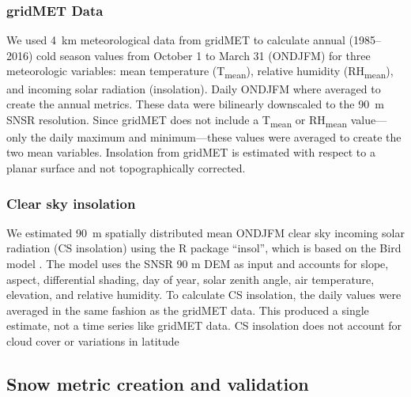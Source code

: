 \hypertarget{ch2-do-2}{\subsubsection{gridMET Data}\label{ch2-do-2}}

We used 4~km meteorological data from gridMET \citep{abatzoglouDevelopmentGriddedSurface2013} to calculate annual (1985--2016) cold season values from October 1 to March 31 (ONDJFM) for three meteorologic variables: mean temperature (T\textsubscript{mean}), relative humidity (RH\textsubscript{mean}), and incoming solar radiation (insolation). Daily ONDJFM where averaged to create the annual metrics. These data were bilinearly downscaled to the 90~m SNSR resolution. Since gridMET does not include a T\textsubscript{mean} or RH\textsubscript{mean} value---only the daily maximum and minimum---these values were averaged to create the two mean variables. Insolation from gridMET is estimated with respect to a planar surface and not topographically corrected. 

\hypertarget{ch2-do-2}{\subsubsection{Clear sky insolation}\label{ch2-do-2}}


We estimated 90~m spatially distributed mean ONDJFM clear sky incoming solar radiation (CS insolation) using the R package “insol”, which is based on the Bird model \citep{birdReviewEvaluationImprovement1981}. The model uses the SNSR 90 m DEM as input and accounts for slope, aspect, differential shading, day of year, solar zenith angle, air temperature, elevation, and relative humidity. To calculate CS insolation, the daily values were averaged in the same fashion as the gridMET data. This produced a single estimate, not a time series like gridMET data. CS insolation does not account for cloud cover or variations in latitude



\hypertarget{ch2-methods-1}{\subsection{Snow metric creation and validation}\label{ch2-methods-1}}

